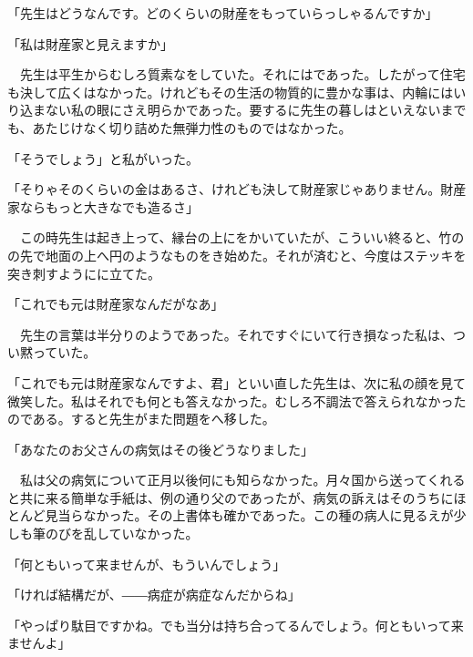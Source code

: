 \documentclass[a4j,onecolumn]{tarticle}
\begin{document}
「先生はどうなんです。\hbox{}どのくらいの財産をもっていらっしゃるんですか」\par{}
「私は財産家と見えますか」\par{}
　先生は平生からむしろ質素なをしていた。\hbox{}それにはであった。\hbox{}したがって住宅も決して広くはなかった。\hbox{}けれどもその生活の物質的に豊かな事は、\hbox{}内輪にはいり込まない私の眼にさえ明らかであった。\hbox{}要するに先生の暮しはといえないまでも、\hbox{}あたじけなく切り詰めた無弾力性のものではなかった。\hbox{}\par{}
「そうでしょう」と私がいった。\hbox{}\par{}
「そりゃそのくらいの金はあるさ、\hbox{}けれども決して財産家じゃありません。\hbox{}財産家ならもっと大きなでも造るさ」\par{}
　この時先生は起き上って、\hbox{}縁台の上にをかいていたが、\hbox{}こういい終ると、\hbox{}竹のの先で地面の上へ円のようなものをき始めた。\hbox{}それが済むと、\hbox{}今度はステッキを突き刺すようにに立てた。\hbox{}\par{}
「これでも元は財産家なんだがなあ」\par{}
　先生の言葉は半分りのようであった。\hbox{}それですぐにいて行き損なった私は、\hbox{}つい黙っていた。\hbox{}\par{}
「これでも元は財産家なんですよ、\hbox{}君」といい直した先生は、\hbox{}次に私の顔を見て微笑した。\hbox{}私はそれでも何とも答えなかった。\hbox{}むしろ不調法で答えられなかったのである。\hbox{}すると先生がまた問題をへ移した。\hbox{}\par{}
「あなたのお父さんの病気はその後どうなりました」\par{}
　私は父の病気について正月以後何にも知らなかった。\hbox{}月々国から送ってくれると共に来る簡単な手紙は、\hbox{}例の通り父のであったが、\hbox{}病気の訴えはそのうちにほとんど見当らなかった。\hbox{}その上書体も確かであった。\hbox{}この種の病人に見るえが少しも筆のびを乱していなかった。\hbox{}\par{}
「何ともいって来ませんが、\hbox{}もういんでしょう」\par{}
「ければ結構だが、\hbox{}――病症が病症なんだからね」\par{}
「やっぱり駄目ですかね。\hbox{}でも当分は持ち合ってるんでしょう。\hbox{}何ともいって来ませんよ」\par{}
\end{document}
